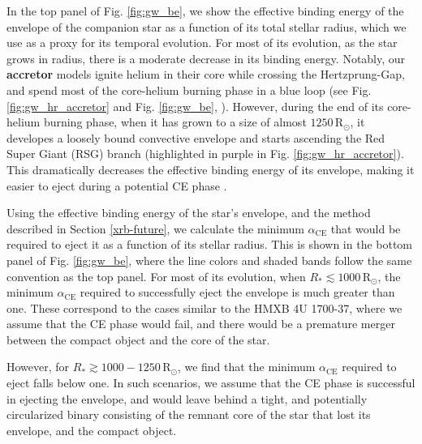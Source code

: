 \documentclass[linenumbers,trackchanges,twocolumn]{aastex701}
\newcommand{\Rdot}{\mathrm{R}_{\odot}}
\begin{document}
In the top panel of Fig. \ref{fig:gw_be}, we show the effective
binding energy of the envelope of the companion star as a function of
its total stellar radius, which we use as a proxy for its temporal
evolution.
For most of its evolution, as the star grows in radius, there is a moderate decrease in its binding energy. Notably, our \textbf{accretor} models ignite helium in their core while crossing the Hertzprung-Gap, and spend most of the core-helium burning phase in a blue loop (see Fig. \ref{fig:gw_hr_accretor} and Fig. \ref{fig:gw_be}, \citealp{2023ApJ...942L..32R}). However, during the end of its core-helium burning phase, when it has grown to a size of almost $1250\,\Rdot$, it developes a loosely bound convective envelope and starts ascending the Red Super Giant (RSG) branch (highlighted in purple in Fig. \ref{fig:gw_hr_accretor}). This dramatically decreases the effective binding energy of its envelope, making it easier to eject during a potential CE phase \citep[e.g.,][]{2021A&A...645A..54K}.

Using the effective binding energy of the star's envelope, and the
method described in Section \ref{xrb-future}, we calculate the minimum
$\alpha_{\text{CE}}$ that would be required to eject it as a function of its stellar radius. This is shown in the bottom panel of Fig. \ref{fig:gw_be}, where the line colors and shaded bands follow the same convention as the top panel. For most of its evolution, when $R_* \lesssim 1000\,\Rdot$, the minimum $\alpha_{\text{CE}}$ required to successfully eject the envelope is much greater than one. These correspond to the cases similar to the HMXB 4U 1700-37, where we assume that the CE phase would fail, and there would be a premature merger between the compact object and the core of the star.

However, for \textbf{$R_* \gtrsim 1000-1250\,\Rdot$}, we find that the minimum $\alpha_{\text{CE}}$ required to eject falls below one. In such scenarios, we assume that the CE phase is successful in ejecting the envelope, and would leave behind a tight, and potentially circularized binary consisting of the remnant core of the star that lost its envelope, and the compact object.
\end{document}
